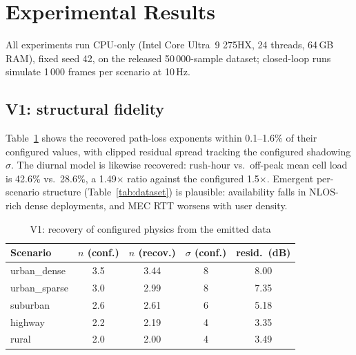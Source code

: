 \documentclass[10pt,conference]{IEEEtran}
\begin{document}
\section{Experimental Results}\label{sec:results}

All experiments run CPU-only (Intel Core Ultra~9 275HX, 24 threads,
64\,GB RAM), fixed seed 42, on the released 50\,000-sample dataset;
closed-loop runs simulate 1\,000 frames per scenario at 10\,Hz.

\subsection{V1: structural fidelity}

Table~\ref{tab:physics} shows the recovered path-loss exponents within
0.1--1.6\% of their configured values, with clipped residual spread
tracking the configured shadowing $\sigma$.  The diurnal model is
likewise recovered: rush-hour vs.\ off-peak mean cell load is 42.6\%
vs.\ 28.6\%, a 1.49$\times$ ratio against the configured 1.5$\times$.
Emergent per-scenario structure (Table~\ref{tab:dataset}) is plausible:
availability falls in NLOS-rich dense deployments, and MEC RTT worsens
with user density.

\begin{table}[t]
\centering
\caption{V1: recovery of configured physics from the emitted data}
\label{tab:physics}
\scriptsize\setlength{\tabcolsep}{4.2pt}
\begin{tabular}{@{}lcccc@{}}
\toprule
\textbf{Scenario} & $n$ (conf.) & $n$ (recov.) & $\sigma$ (conf.) & resid.\ (dB) \\
\midrule
urban\_dense  & 3.5 & 3.44 & 8 & 8.00 \\
urban\_sparse & 3.0 & 2.99 & 8 & 7.35 \\
suburban      & 2.6 & 2.61 & 6 & 5.18 \\
highway       & 2.2 & 2.19 & 4 & 3.35 \\
rural         & 2.0 & 2.00 & 4 & 3.49 \\
\bottomrule
\end{tabular}
\end{table}
\end{document}
